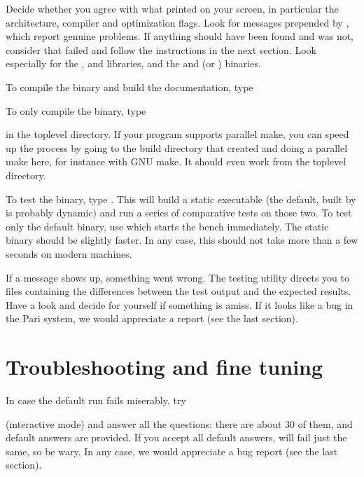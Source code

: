 Decide whether you agree with what  printed on your screen, in
particular the architecture, compiler and optimization flags. Look for
messages prepended by \kbd{\#\#\#}, which report genuine problems. If
anything should have been found and was not, consider that 
failed and follow the instructions in the next section. Look especially for
the ,  and  libraries, and the  and
 (or ) binaries.

 To compile the  binary and build the
documentation, type


\noindent To only compile the  binary, type


\noindent in the toplevel directory. If your  program supports
parallel make, you can speed up the process by going to the build
directory that  created and doing a parallel make here, for
instance  with GNU make. It should even work from the toplevel
directory.


To test the binary, type . This will build a static
executable (the default, built by  is probably dynamic) and
run a series of comparative tests on those two. To test only the default
binary, use  which starts the bench immediately.
The static binary should be slightly faster. In any case, this should not
take more than a few seconds on modern machines.

If a \kbd{[BUG]} message shows up, something went wrong. The testing utility
directs you to files containing the differences between the test output and
the expected results. Have a look and decide for yourself if something is
amiss. If it looks like a bug in the Pari system, we would appreciate a
report (see the last section).

\section{Troubleshooting and fine tuning}
In case the default  run fails miserably, try


\noindent (interactive mode) and answer all the questions: there are about 30
of them, and default answers are provided. If you accept all default answers,
 will fail just the same, so be wary. In any case, we would
appreciate a bug report (see the last section).

